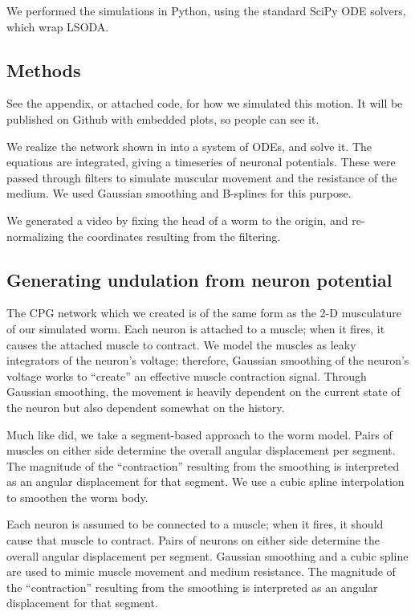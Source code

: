 \documentclass[
    11pt,
]{article}
\begin{document}
We performed the simulations in Python, using the standard SciPy ODE solvers, which wrap LSODA. %

\subsection{Methods}

See the appendix, or attached code, for how we simulated this motion.  It will be published on Github with embedded plots, so people can see it.

We realize the network shown in  into a system of ODEs, and solve it.  The equations are integrated, giving a timeseries of neuronal potentials.  These were passed through filters to simulate muscular movement and the resistance of the medium.  We used Gaussian smoothing and B-splines for this purpose.

We generated a video by fixing the head of a worm to the origin, and re-normalizing the coordinates resulting from the filtering.

\subsection{Generating undulation from neuron potential}

The CPG network which we created is of the same form as the 2-D musculature of our simulated worm.  Each neuron is attached to a muscle; when it fires, it causes the attached muscle to contract.​  We model the muscles as leaky integrators of the neuron's voltage; therefore, Gaussian smoothing of the neuron's voltage works to ``create'' an effective muscle contraction signal.  Through Gaussian smoothing, the movement is heavily dependent on the current state of the neuron but also dependent somewhat on the history. ​

Much like \citet{izquierdo2018} did, we take a segment-based approach to the worm model.  Pairs of muscles on either side determine the overall angular displacement per segment.​  The magnitude of the “contraction” resulting from the smoothing is interpreted as an angular displacement for that segment.​  We use a cubic spline interpolation to smoothen the worm body.

Each neuron is assumed to be connected to a muscle; when it fires, it should cause that muscle to contract.​
Pairs of neurons on either side determine the overall angular displacement per segment.​
Gaussian smoothing and a cubic spline are used to mimic muscle movement and medium resistance.​
The magnitude of the “contraction” resulting from the smoothing is interpreted as an angular displacement for that segment.​
\end{document}
